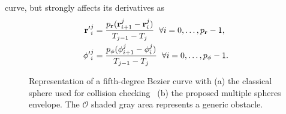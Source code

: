 curve, but strongly affects its derivatives as 
\begin{align*}
	{\mathbf{r}'}^j_i & = \frac{p_{\mathbf{r}}(\mathbf{r}^j_{i+1}-\mathbf{r}^j_i)}{T_{j-1}-T_j} \hspace{0.2cm} \forall i=0,\dots,p_{\mathbf{r}}-1 , \\
	{\phi'}^j_i & = \frac{p_{\phi}(\phi^j_{i+1}-\phi^j_i)}{T_{j-1}-T_j} \hspace{0.2cm} \forall i=0,\dots,p_{\phi}-1 .
\end{align*}
\begin{figure}[!t]
	\begin{minipage}{.45\linewidth}
		\centering
	\end{minipage}
	\begin{minipage}{.45\linewidth}
		\centering
	\end{minipage}
	\caption{Representation of a fifth-degree B\acuteacc ezier curve with
	(a) the classical sphere used for collision checking~\cite{tang2020real}
	(b) the proposed multiple spheres envelope.
	The $\mathcal{O}$ shaded gray area represents a generic obstacle.}\label{fig:BEZIER-CURVE}
\end{figure}
